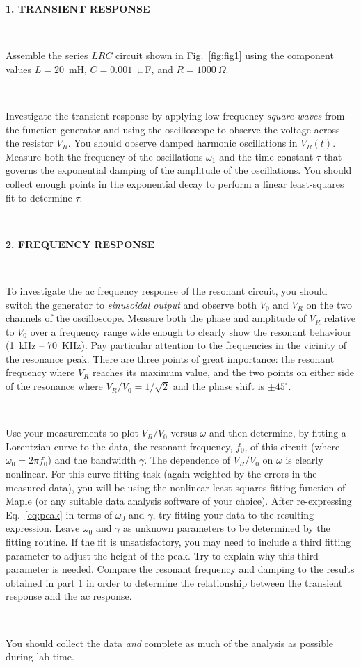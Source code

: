 \documentclass[12pt,oneside,openany,letterpaper]{article}
\begin{document}
{\bf 1. TRANSIENT RESPONSE}

~

\noindent Assemble the series $LRC$ circuit shown in Fig.~\ref{fig:fig1} using the component values \mbox{$L=20$~mH}, \mbox{$C=0.001~\upmu$F}, and \mbox{$R=1000~\Omega$}.

~

\noindent Investigate the transient response by applying low frequency \emph{square waves} from the function generator and using the oscilloscope to observe the voltage across the resistor $V_R$. You should observe damped harmonic oscillations in $V_R(t)$. Measure both the frequency of the oscillations $\omega_1$ and the time constant $\tau$ that governs the exponential damping of the amplitude of the oscillations. You should collect enough points in the exponential decay to perform a linear least-squares fit to determine $\tau$.

~

{\bf 2. FREQUENCY RESPONSE}

~

\noindent To investigate the ac frequency response of the resonant circuit, you should switch the generator to \emph{sinusoidal output} and observe both $V_0$ and $V_R$ on the two channels of the oscilloscope. Measure both the phase and amplitude of $V_R$ relative to $V_0$ over a frequency range wide enough to clearly show the resonant behaviour (1~kHz -- 70~KHz). Pay particular attention to the frequencies in the vicinity of the resonance peak. There are three points of great importance: the resonant frequency where $V_R$ reaches its maximum value, and the two points on either side of the resonance where $V_R/V_0 = 1/\sqrt{2}$ and the phase shift is $\pm 45^\circ$.

~

\noindent Use your measurements to plot $V_R /V_0$ versus $\omega$ and then determine, by fitting a Lorentzian curve to the data, the resonant frequency, $f_0$, of this circuit (where $\omega_0=2\pi f_0$) and the bandwidth $\gamma$. The dependence of $V_R /V_0$ on $\omega$ is clearly nonlinear.  For this curve-fitting task (again weighted by the errors in the measured data), you will be using the nonlinear least squares fitting function of Maple (or any suitable data analysis software of your choice).  After re-expressing Eq.~\ref{eq:peak} in terms of $\omega_0$ and $\gamma$, try fitting your data to the resulting expression.  Leave $\omega_0$ and $\gamma$ as unknown parameters to be determined by the fitting routine. If the fit is unsatisfactory, you may need to include a third fitting parameter to adjust the height of the peak. Try to explain why this third parameter is needed. Compare the resonant frequency and damping to the results obtained in part 1 in order to determine the relationship between the transient response and the ac response.

~

  You should collect the data \emph{and} complete as much of the analysis as possible during lab time.  
\end{document}
